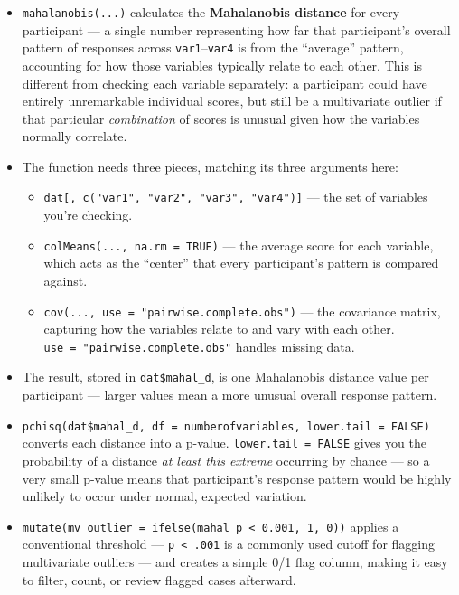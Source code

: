 \documentclass[
  letterpaper,
  DIV=11,
  numbers=noendperiod]{scrreprt}
\begin{document}
\begin{itemize}
\item
  \texttt{mahalanobis(...)} calculates the \textbf{Mahalanobis distance}
  for every participant --- a single number representing how far that
  participant's overall pattern of responses across
  \texttt{var1}--\texttt{var4} is from the ``average'' pattern,
  accounting for how those variables typically relate to each other.
  This is different from checking each variable separately: a
  participant could have entirely unremarkable individual scores, but
  still be a multivariate outlier if that particular \emph{combination}
  of scores is unusual given how the variables normally correlate.
\item
  The function needs three pieces, matching its three arguments here:

  \begin{itemize}
  \item
    \texttt{dat{[},\ c("var1",\ "var2",\ "var3",\ "var4"){]}} --- the
    set of variables you're checking.
  \item
    \texttt{colMeans(...,\ na.rm\ =\ TRUE)} --- the average score for
    each variable, which acts as the ``center'' that every participant's
    pattern is compared against.
  \item
    \texttt{cov(...,\ use\ =\ "pairwise.complete.obs")} --- the
    covariance matrix, capturing how the variables relate to and vary
    with each other. \texttt{use\ =\ "pairwise.complete.obs"} handles
    missing data.
  \end{itemize}
\item
  The result, stored in \texttt{dat\$mahal\_d}, is one Mahalanobis
  distance value per participant --- larger values mean a more unusual
  overall response pattern.
\item
  \texttt{pchisq(dat\$mahal\_d,\ df\ =\ numberofvariables,\ lower.tail\ =\ FALSE)}
  converts each distance into a p-value. \texttt{lower.tail\ =\ FALSE}
  gives you the probability of a distance \emph{at least this extreme}
  occurring by chance --- so a very small p-value means that
  participant's response pattern would be highly unlikely to occur under
  normal, expected variation.
\item
  \texttt{mutate(mv\_outlier\ =\ ifelse(mahal\_p\ \textless{}\ 0.001,\ 1,\ 0))}
  applies a conventional threshold --- \texttt{p\ \textless{}\ .001} is
  a commonly used cutoff for flagging multivariate outliers --- and
  creates a simple 0/1 flag column, making it easy to filter, count, or
  review flagged cases afterward.
\end{itemize}
\end{document}
